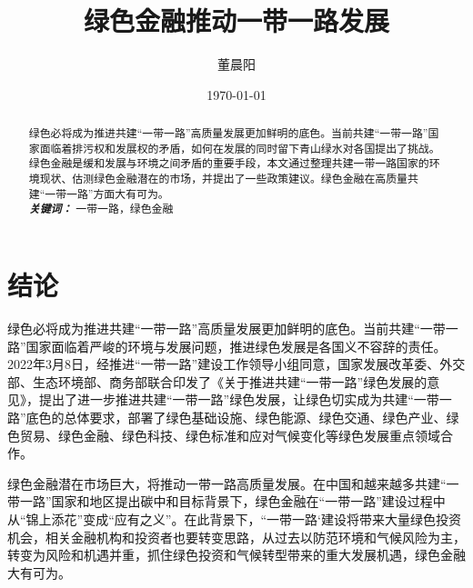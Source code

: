 \documentclass[a4paper,12pt]{ctexart}
\title{绿色金融推动一带一路发展}
\author{董晨阳}
\date{\today}
\providecommand{\keywords}[1]{\\\textbf{\textit{关键词：}} #1}
\begin{document}
\maketitle
\begin{abstract}
    绿色必将成为推进共建“一带一路”高质量发展更加鲜明的底色。当前共建“一带一路”国家面临着排污权和发展权的矛盾，如何在发展的同时留下青山绿水对各国提出了挑战。绿色金融是缓和发展与环境之间矛盾的重要手段，本文通过整理共建一带一路国家的环境现状、估测绿色金融潜在的市场，并提出了一些政策建议。绿色金融在高质量共建“一带一路”方面大有可为。
\keywords{一带一路，绿色金融}
\end{abstract}
\clearpage


\section*{结论}
绿色必将成为推进共建“一带一路”高质量发展更加鲜明的底色。当前共建“一带一路”国家面临着严峻的环境与发展问题，推进绿色发展是各国义不容辞的责任。2022年3月8日，经推进“一带一路”建设工作领导小组同意，国家发展改革委、外交部、生态环境部、商务部联合印发了《关于推进共建“一带一路”绿色发展的意见》，提出了进一步推进共建“一带一路”绿色发展，让绿色切实成为共建“一带一路”底色的总体要求，部署了绿色基础设施、绿色能源、绿色交通、绿色产业、绿色贸易、绿色金融、绿色科技、绿色标准和应对气候变化等绿色发展重点领域合作。

绿色金融潜在市场巨大，将推动一带一路高质量发展。在中国和越来越多共建“一带一路”国家和地区提出碳中和目标背景下，绿色金融在“一带一路”建设过程中从“锦上添花”变成“应有之义”。在此背景下，“一带一路‘建设将带来大量绿色投资机会，相关金融机构和投资者也要转变思路，从过去以防范环境和气候风险为主，转变为风险和机遇并重，抓住绿色投资和气候转型带来的重大发展机遇，绿色金融大有可为。
\nocite{*}
\printbibliography
\end{document}

